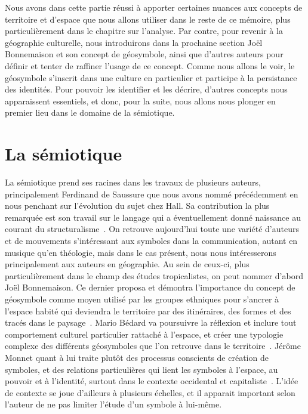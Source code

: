 Nous avons dans cette partie réussi à apporter certaines nuances aux concepts de territoire et d'espace que nous allons utiliser dans le reste de ce mémoire, plus particulièrement dans le chapitre sur l'analyse.
Par contre, pour revenir à la géographie culturelle, nous introduirons dans la prochaine section Joël Bonnemaison et son concept de géosymbole, ainsi que d'autres auteurs pour définir et tenter de raffiner l'usage de ce concept.
Comme nous allons le voir, le géosymbole s'inscrit dans une culture en particulier et participe à la persistance des identités.
Pour pouvoir les identifier et les décrire, d'autres concepts nous apparaissent essentiels, et donc, pour la suite, nous allons nous plonger en premier lieu dans le domaine de la sémiotique.

\section{La sémiotique}
\label{ssub:la_semiotique} La sémiotique prend ses racines dans les travaux de plusieurs auteurs, principalement Ferdinand de Saussure que nous avons nommé précédemment en nous penchant sur l'évolution du sujet chez Hall.
Sa contribution la plus remarquée est son travail sur le langage qui a éventuellement donné naissance au courant du structuralisme~\citep{Noth1995}.
On retrouve aujourd'hui toute une variété d'auteurs et de mouvements s'intéressant aux symboles dans la communication, autant en musique qu'en théologie, mais dans le cas présent, nous nous intéresserons principalement aux auteurs en géographie.
Au sein de ceux-ci, plus particulièrement dans le champ des études tropicalistes, on peut nommer d'abord Joël Bonnemaison.
Ce dernier proposa et démontra l'importance du concept de géosymbole comme moyen utilisé par les groupes ethniques pour s'ancrer à l'espace habité qui deviendra le territoire par des itinéraires, des formes et des tracés dans le paysage~\citep{Bonnemaison1981}.
Mario Bédard va poursuivre la réflexion et inclure tout comportement culturel particulier rattaché à l'espace, et créer une typologie complexe des différents géosymboles que l'on retrouve dans le territoire~\citep{Bedard2002}.
Jérôme Monnet quant à lui traite plutôt des processus conscients de création de symboles, et des relations particulières qui lient les symboles à l'espace, au pouvoir et à l'identité, surtout dans le contexte occidental et capitaliste~\citep{Monnet1998}.
L'idée de contexte se joue d'ailleurs à plusieurs échelles, et il apparait important selon l'auteur de ne pas limiter l'étude d'un symbole à lui-même.

